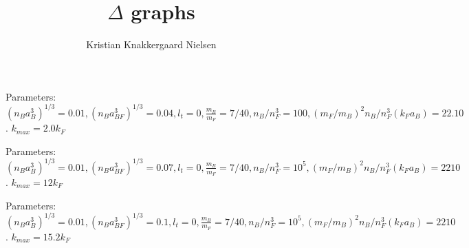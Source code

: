 \documentclass[english,10pt]{article}
\title{$\Delta$ graphs}
\author{Kristian Knakkergaard Nielsen}
\begin{document}
\maketitle


\begin{figure} 
\begin{center}  
  
\caption{Parameters: $(n_Ba_B^3)^{1/3} = 0.01, (n_Ba_{BF}^3)^{1/3} = 0.04, l_t = 0, \frac{m_B}{m_F} = 7/40, n_B/n_F^3 = 100, (m_F/m_B)^2n_B/n_F^3 (k_Fa_B) = 22.10$. $k_{max} = 2.0 k_F$}  
\label{fig.maxkDeltakaBFdepend}  
\end{center}    
\end{figure}

\begin{figure} 
\begin{center}  
  
\caption{Parameters: $(n_Ba_B^3)^{1/3} = 0.01, (n_Ba_{BF}^3)^{1/3} = 0.07, l_t = 0, \frac{m_B}{m_F} = 7/40, n_B/n_F^3 = 10^5, (m_F/m_B)^2n_B/n_F^3 (k_Fa_B) = 2210$. $k_{max} = 12 k_F$}  
\label{fig.maxkDeltakaBFdepend}  
\end{center}    
\end{figure}

\begin{figure} 
\begin{center}  
  
\caption{Parameters: $(n_Ba_B^3)^{1/3} = 0.01, (n_Ba_{BF}^3)^{1/3} = 0.1, l_t = 0, \frac{m_B}{m_F} = 7/40, n_B/n_F^3 = 10^5, (m_F/m_B)^2n_B/n_F^3 (k_Fa_B) = 2210$. $k_{max} = 15.2 k_F$}  
\label{fig.maxkDeltakaBFdepend}  
\end{center}    
\end{figure}
\end{document}
